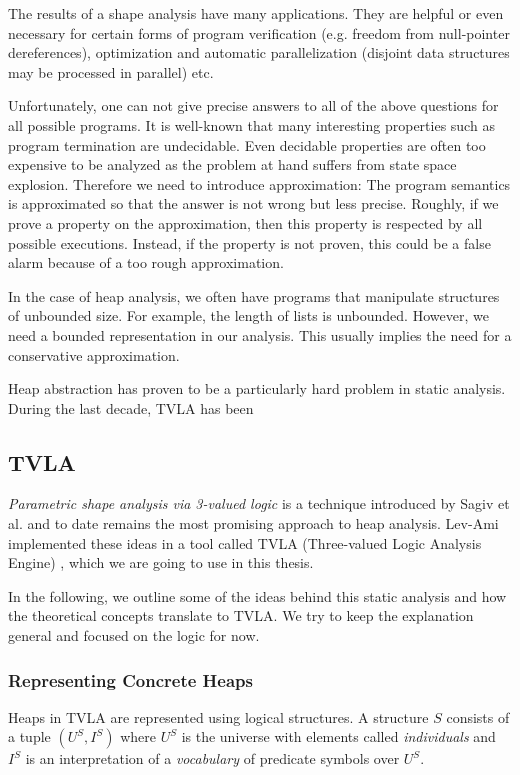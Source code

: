\documentclass[11pt,a4paper,english]{article}
\begin{document}
The results of a shape analysis have many applications. They are helpful or even
necessary for certain forms of program verification (e.g. freedom from
null-pointer dereferences), optimization and automatic parallelization (disjoint
data structures may be processed in parallel) etc.

Unfortunately, one can not give precise answers to all of the above questions
for all possible programs. It is well-known that many interesting properties
such as program termination are undecidable. Even decidable properties are often
too expensive to be analyzed as the problem at hand suffers from state space
explosion. Therefore we need to introduce approximation: The program semantics is
approximated so that the answer is not wrong but less precise. Roughly, if we
prove a property on the approximation, then this property is respected by all
possible executions. Instead, if the property is not proven, this could be a
false alarm because of a too rough approximation.

In the case of heap analysis, we often have programs that manipulate
structures of unbounded size. For example, the length of lists is unbounded.
However, we need a bounded representation in our analysis.  This usually implies
the need for a conservative approximation.

Heap abstraction has proven to be a particularly hard problem in static
analysis. During the last decade, TVLA has been

\subsection{TVLA} 
\textit{Parametric shape analysis via 3-valued logic} is a technique introduced
by Sagiv et al.  \cite{sagiv2002parametric} and to date remains the most
promising approach to heap analysis. Lev-Ami implemented these ideas in a tool
called TVLA (Three-valued Logic Analysis Engine) \cite{lev2000tvla}, which we
are going to use in this thesis.

In the following, we outline some of the ideas behind this static
analysis and how the theoretical concepts translate to TVLA. We try to keep the
explanation general and focused on the logic for now. 

\subsubsection{Representing Concrete Heaps}
\label{sct:structDef}
Heaps in TVLA are represented using logical structures. A structure $S$
consists of a tuple $(U^S,I^S)$ where $U^S$ is the universe with elements called
\textit{individuals} and $I^S$ is an interpretation of a \textit{vocabulary} of
predicate symbols over $U^S$.
\end{document}
